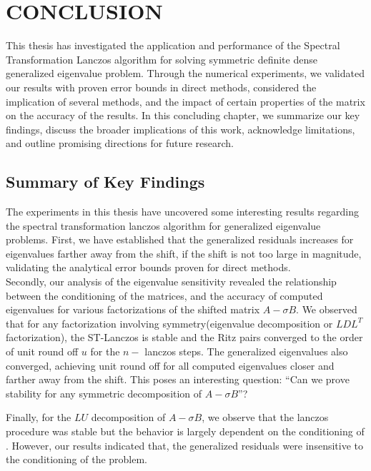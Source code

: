 \chapter{CONCLUSION}
This thesis has investigated the application and performance of the Spectral Transformation Lanczos algorithm for solving symmetric definite dense generalized eigenvalue problem. Through the numerical experiments, we validated our results with proven error bounds in direct methods, considered the implication of several methods, and the impact of certain properties of the matrix on the accuracy of the results. In this concluding chapter, we summarize our key findings, discuss the broader implications of this work, acknowledge limitations, and outline promising directions for future research.

\section{Summary of Key Findings}
The experiments in this thesis have uncovered some interesting results regarding the spectral transformation lanczos algorithm for generalized eigenvalue problems. First, we have established that the generalized residuals increases for eigenvalues farther away from the shift, if the shift is not too large in magnitude, validating the analytical error bounds proven for direct methods.\\[10pt]
Secondly, our analysis of the eigenvalue sensitivity revealed the relationship between the conditioning of the matrices, and the accuracy of computed eigenvalues for various factorizations of the shifted matrix $A-\sigma B$. We observed that for any factorization involving symmetry(eigenvalue decomposition or $LDL^T$ factorization), the ST-Lanczos is stable and the Ritz pairs converged to the order of unit round off $u$ for the $n-$ lanczos steps. The generalized eigenvalues also converged, achieving unit round off for all computed eigenvalues closer and farther away from the shift. This poses an interesting question: ``Can we prove stability for any symmetric decomposition of $A - \sigma B$''?

Finally, for the $LU$ decomposition of $A - \sigma B$, we observe that the lanczos procedure was stable but the behavior is largely dependent on the conditioning of . However, our results indicated that, the generalized residuals were insensitive to the conditioning of the problem.

